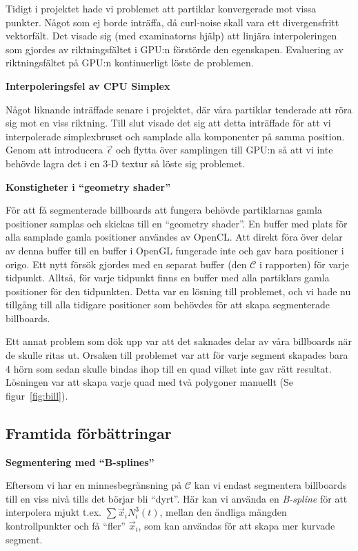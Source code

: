 \documentclass[a4paper]{article}
\begin{document}
\begin{multicols}{2}
            Tidigt i projektet hade vi problemet att partiklar konvergerade mot vissa punkter. Något som ej borde inträffa, då curl-noise skall vara ett divergensfritt vektorfält. Det visade sig (med examinatorns hjälp) att linjära interpoleringen som gjordes av riktningsfältet i GPU:n förstörde den egenskapen. Evaluering av riktningsfältet på GPU:n kontinuerligt löste de problemen.

            \textbf{Interpoleringsfel av CPU Simplex}

            Något liknande inträffade senare i projektet, där våra partiklar tenderade att röra sig mot en viss riktning. Till slut visade det sig att detta inträffade för att vi interpolerade simplexbruset och samplade alla komponenter på samma position. Genom att introducera $\vec{\epsilon}$ och flytta över samplingen till GPU:n så att vi inte behövde lagra det i en 3-D textur så löste sig problemet.

            \textbf{Konstigheter i ``geometry shader''}
            
            För att få segmenterade billboards att fungera behövde partiklarnas gamla positioner samplas och skickas till en ``geometry shader''. En buffer med plats för alla samplade gamla positioner användes av OpenCL. Att direkt föra över delar av denna buffer till en buffer i OpenGL fungerade inte och gav bara positioner i origo. Ett nytt försök gjordes med en separat buffer (den \(\mathcal{C}\) i rapporten) för varje tidpunkt. Alltså, för varje tidpunkt finns en buffer med alla partiklars gamla positioner för den tidpunkten. Detta var en lösning till problemet, och vi hade nu tillgång till alla tidigare positioner som behövdes för att skapa segmenterade billboards.
            
            Ett annat problem som dök upp var att det saknades delar av våra billboards när de skulle ritas ut. Orsaken till problemet var att för varje segment skapades bara 4 hörn som sedan skulle bindas ihop till en quad vilket inte gav rätt resultat. Lösningen var att skapa varje quad med två polygoner manuellt (Se figur~\ref{fig:bill}). 

        \subsection{Framtida förbättringar}

            \textbf{Segmentering med ``B-splines''}

            Eftersom vi har en minnesbegränsning på \(\mathcal{C}\) kan vi endast segmentera billboards till en viss nivå tills det börjar bli ``dyrt''. Här kan vi använda en \emph{B-spline} för att interpolera mjukt t.ex. \(\sum \vec{x}_i N^3_i(t)\), mellan den ändliga mängden kontrollpunkter och få ``fler'' \(\vec{x}_i\), som kan användas för att skapa mer kurvade segment.


\end{multicols}
\end{document}
